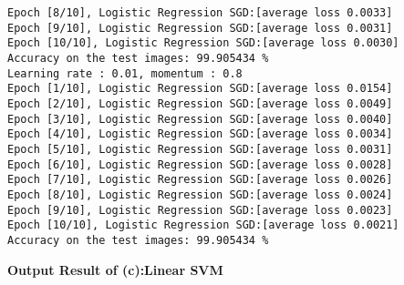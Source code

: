 \documentclass[10pt]{article}
\newcommand{\0}{{\mathbf{0}}}
\newcommand{\1}{{\mathbf{1}}}
\begin{document}
\begin{verbatim}
Epoch [8/10], Logistic Regression SGD:[average loss 0.0033]
Epoch [9/10], Logistic Regression SGD:[average loss 0.0031]
Epoch [10/10], Logistic Regression SGD:[average loss 0.0030]
Accuracy on the test images: 99.905434 %
Learning rate : 0.01, momentum : 0.8
Epoch [1/10], Logistic Regression SGD:[average loss 0.0154]
Epoch [2/10], Logistic Regression SGD:[average loss 0.0049]
Epoch [3/10], Logistic Regression SGD:[average loss 0.0040]
Epoch [4/10], Logistic Regression SGD:[average loss 0.0034]
Epoch [5/10], Logistic Regression SGD:[average loss 0.0031]
Epoch [6/10], Logistic Regression SGD:[average loss 0.0028]
Epoch [7/10], Logistic Regression SGD:[average loss 0.0026]
Epoch [8/10], Logistic Regression SGD:[average loss 0.0024]
Epoch [9/10], Logistic Regression SGD:[average loss 0.0023]
Epoch [10/10], Logistic Regression SGD:[average loss 0.0021]
Accuracy on the test images: 99.905434 %
\end{verbatim}

\newpage
\textbf{Output Result of (c):Linear SVM}
\end{document}
